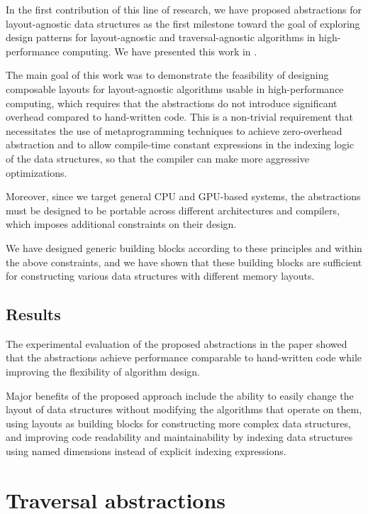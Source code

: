 In the first contribution of this line of research, we have proposed abstractions for layout-agnostic data structures as the first milestone toward the goal of exploring design patterns for layout-agnostic and traversal-agnostic algorithms in high-performance computing. We have presented this work in .

The main goal of this work was to demonstrate the feasibility of designing composable layouts for layout-agnostic algorithms usable in high-performance computing, which requires that the abstractions do not introduce significant overhead compared to hand-written code. This is a non-trivial requirement that necessitates the use of metaprogramming techniques to achieve zero-overhead abstraction and to allow compile-time constant expressions in the indexing logic of the data structures, so that the compiler can make more aggressive optimizations.

Moreover, since we target general CPU and GPU-based systems, the abstractions must be designed to be portable across different architectures and compilers, which imposes additional constraints on their design.

We have designed generic building blocks according to these principles and within the above constraints, and we have shown that these building blocks are sufficient for constructing various data structures with different memory layouts.


\subsection{Results}\label{sec:astute-results}

The experimental evaluation of the proposed abstractions in the paper showed that the abstractions achieve performance comparable to hand-written code while improving the flexibility of algorithm design.

Major benefits of the proposed approach include the ability to easily change the layout of data structures without modifying the algorithms that operate on them, using layouts as building blocks for constructing more complex data structures, and improving code readability and maintainability by indexing data structures using named dimensions instead of explicit indexing expressions.


\section{Traversal abstractions}\label{sec:pure-cpp-approach}

